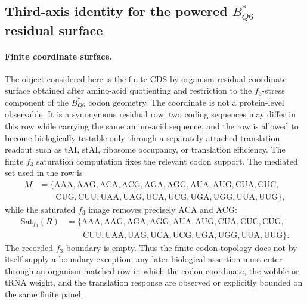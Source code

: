 
\subsection{Third-axis identity for the powered $B^*_{Q6}$ residual surface}
\label{sec:biorality-q6-f3-stress-third-axis-identity}

\paragraph{Finite coordinate surface.}
The object considered here is the finite CDS-by-organism residual coordinate surface obtained after amino-acid quotienting and restriction to the $f_3$-stress component of the $B^*_{Q6}$ codon geometry.  The coordinate is not a protein-level observable.  It is a synonymous residual row: two coding sequences may differ in this row while carrying the same amino-acid sequence, and the row is allowed to become biologically testable only through a separately attached translation readout such as tAI, stAI, ribosome occupancy, or translation efficiency.  The finite $f_3$ saturation computation fixes the relevant codon support.  The mediated set used in the row is
$$\begin{aligned}
M &= \{\mathrm{AAA},\mathrm{AAG},\mathrm{ACA},\mathrm{ACG},\mathrm{AGA},\mathrm{AGG},\mathrm{AUA},\mathrm{AUG},\mathrm{CUA},\mathrm{CUC},\\
&\qquad \mathrm{CUG},\mathrm{CUU},\mathrm{UAA},\mathrm{UAG},\mathrm{UCA},\mathrm{UCG},\mathrm{UGA},\mathrm{UGG},\mathrm{UUA},\mathrm{UUG}\},
\end{aligned}$$
while the saturated $f_3$ image removes precisely $\mathrm{ACA}$ and $\mathrm{ACG}$:
$$\begin{aligned}
\mathrm{Sat}_{f_3}(R) &= \{\mathrm{AAA},\mathrm{AAG},\mathrm{AGA},\mathrm{AGG},\mathrm{AUA},\mathrm{AUG},\mathrm{CUA},\mathrm{CUC},\mathrm{CUG},\\
&\qquad \mathrm{CUU},\mathrm{UAA},\mathrm{UAG},\mathrm{UCA},\mathrm{UCG},\mathrm{UGA},\mathrm{UGG},\mathrm{UUA},\mathrm{UUG}\}.
\end{aligned}$$
The recorded $f_3$ boundary is empty.  Thus the finite codon topology does not by itself supply a boundary exception; any later biological assertion must enter through an organism-matched row in which the codon coordinate, the wobble or tRNA weight, and the translation response are observed or explicitly bounded on the same finite panel.

